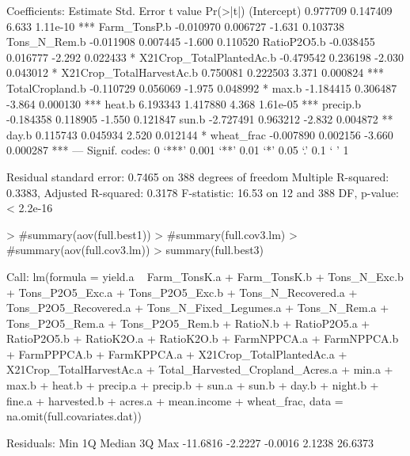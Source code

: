 \documentclass{report}
\begin{document}
\begin{Schunk}
\begin{Soutput}
Coefficients:
                          Estimate Std. Error t value Pr(>|t|)    
(Intercept)               0.977709   0.147409   6.633 1.11e-10 ***
Farm_TonsP.b             -0.010970   0.006727  -1.631 0.103738    
Tons_N_Rem.b             -0.011908   0.007445  -1.600 0.110520    
RatioP2O5.b              -0.038455   0.016777  -2.292 0.022433 *  
X21Crop_TotalPlantedAc.b -0.479542   0.236198  -2.030 0.043012 *  
X21Crop_TotalHarvestAc.b  0.750081   0.222503   3.371 0.000824 ***
TotalCropland.b          -0.110729   0.056069  -1.975 0.048992 *  
max.b                    -1.184415   0.306487  -3.864 0.000130 ***
heat.b                    6.193343   1.417880   4.368 1.61e-05 ***
precip.b                 -0.184358   0.118905  -1.550 0.121847    
sun.b                    -2.727491   0.963212  -2.832 0.004872 ** 
day.b                     0.115743   0.045934   2.520 0.012144 *  
wheat_frac               -0.007890   0.002156  -3.660 0.000287 ***
---
Signif. codes:  0 ‘***’ 0.001 ‘**’ 0.01 ‘*’ 0.05 ‘.’ 0.1 ‘ ’ 1

Residual standard error: 0.7465 on 388 degrees of freedom
Multiple R-squared:  0.3383,	Adjusted R-squared:  0.3178 
F-statistic: 16.53 on 12 and 388 DF,  p-value: < 2.2e-16
\end{Soutput}
\begin{Sinput}
> #summary(aov(full.best1))
> #summary(full.cov3.lm)
> #summary(aov(full.cov3.lm))
> summary(full.best3)
\end{Sinput}
\begin{Soutput}
Call:
lm(formula = yield.a ~ Farm_TonsK.a + Farm_TonsK.b + Tons_N_Exc.b + 
    Tons_P2O5_Exc.a + Tons_P2O5_Exc.b + Tons_N_Recovered.a + 
    Tons_P2O5_Recovered.a + Tons_N_Fixed_Legumes.a + Tons_N_Rem.a + 
    Tons_P2O5_Rem.a + Tons_P2O5_Rem.b + RatioN.b + RatioP2O5.a + 
    RatioP2O5.b + RatioK2O.a + RatioK2O.b + FarmNPPCA.a + FarmNPPCA.b + 
    FarmPPPCA.b + FarmKPPCA.a + X21Crop_TotalPlantedAc.a + X21Crop_TotalHarvestAc.a + 
    Total_Harvested_Cropland_Acres.a + min.a + max.b + heat.b + 
    precip.a + precip.b + sun.a + sun.b + day.b + night.b + fine.a + 
    harvested.b + acres.a + mean.income + wheat_frac, data = na.omit(full.covariates.dat))

Residuals:
     Min       1Q   Median       3Q      Max 
-11.6816  -2.2227  -0.0016   2.1238  26.6373 


\end{Soutput}
\end{Schunk}
\end{document}
